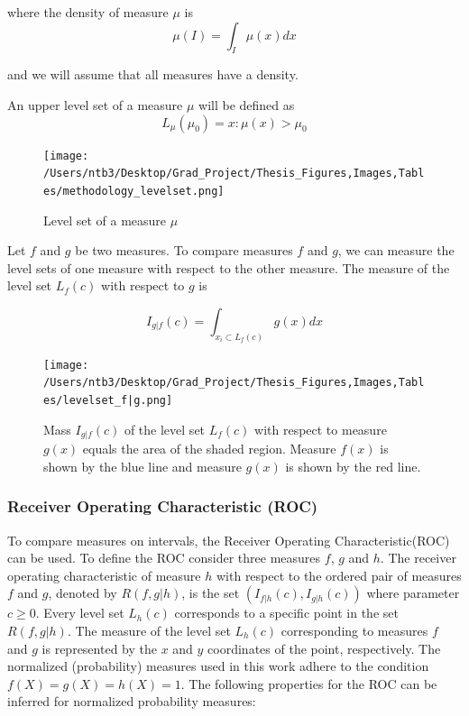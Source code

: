 \documentclass[12pt]{article} %
\theoremstyle{plain}
\begin{document}
		
	\noindent where the density of measure $\mu$ is 
	\begin{equation}
		\mu(I)=\int_{I}\mu(x)dx
	\end{equation}

	\noindent and we will assume that all measures have a density. 
	
	An upper level set of a measure $\mu$ will be defined as  
	\begin{equation}
		L_\mu(\mu_0)={x:\mu(x)>\mu_0}
	\end{equation}

	\begin{figure} [!htbp]
	\centering
	\texttt{[image: /Users/ntb3/Desktop/Grad\_Project/Thesis\_Figures,Images,Tables/methodology\_levelset.png]}
	\caption{Level set of a measure $\mu$}
	\label{fig:level set}
	\end{figure}

 
 
 Let $f$ and $g$ be two measures. To compare measures $f$ and $g$, we can measure the level sets of one measure with respect to the other measure. The measure of the level set $L_f(c)$ with respect to $g$ is 
 
 \begin{equation} \label{eq:conditionallevelset}
 	I_{g|f}(c)=\int_{x_i \subset L_f(c)} g(x) dx
 \end{equation}
 
 	\begin{figure} [!htbp]
 	\centering
 	\texttt{[image: /Users/ntb3/Desktop/Grad\_Project/Thesis\_Figures,Images,Tables/levelset\_f|g.png]}
 	\caption{Mass $I_{g|f}(c)$ of the level set $L_f(c)$ with respect to measure $g(x)$ equals the area of the shaded region. Measure $f(x)$ is shown by the blue line and measure $g(x)$ is shown by the red line.}
 	\label{fig:mass_of_level_sets}
 \end{figure}
 
 \subsubsection{Receiver Operating Characteristic (ROC)}
 To compare measures on intervals, the Receiver Operating Characteristic(ROC) can be used. To define the ROC consider three measures $f$, $g$ and $h$. The receiver operating characteristic of measure $h$ with respect to the ordered pair of measures $f$ and $g$, denoted by $R(f,g|h)$, is the set $(I_{f|h}(c),I_{g|h}(c))$ where parameter $c \geq 0$. Every level set $L_h(c)$ corresponds to a specific point in the set $R(f,g|h)$. The measure of the level set $L_h(c)$ corresponding to measures $f$ and $g$ is represented by the $x$ and $y$ coordinates of the point, respectively. The normalized (probability) measures used in this work adhere to the condition $f(X) = g(X) = h(X) = 1$. The following properties for the ROC can be inferred for normalized probability measures:
 
\end{document}
